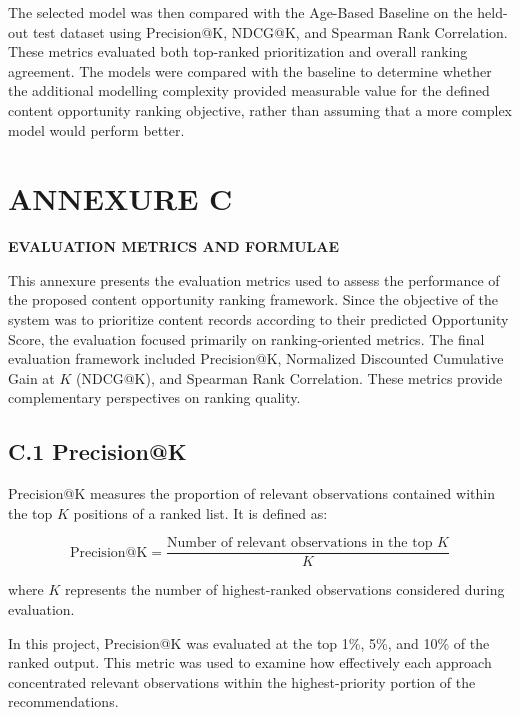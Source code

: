 \documentclass[12pt,a4paper]{report}
\begin{document}
The selected model was then compared with the Age-Based Baseline on the held-out test dataset using Precision@K, NDCG@K, and Spearman Rank Correlation. These metrics evaluated both top-ranked prioritization and overall ranking agreement. The models were compared with the baseline to determine whether the additional modelling complexity provided measurable value for the defined content opportunity ranking objective, rather than assuming that a more complex model would perform better.

\chapter*{ANNEXURE C}


\begin{center}
    \textbf{\Large EVALUATION METRICS AND FORMULAE}
\end{center}

\vspace{0.5cm}

This annexure presents the evaluation metrics used to assess the performance of the proposed content opportunity ranking framework. Since the objective of the system was to prioritize content records according to their predicted Opportunity Score, the evaluation focused primarily on ranking-oriented metrics. The final evaluation framework included Precision@K, Normalized Discounted Cumulative Gain at $K$ (NDCG@K), and Spearman Rank Correlation. These metrics provide complementary perspectives on ranking quality.

\section*{C.1 Precision@K}

Precision@K measures the proportion of relevant observations contained within the top $K$ positions of a ranked list. It is defined as:

\begin{equation}
\text{Precision@K}
=
\frac{\text{Number of relevant observations in the top } K}
{K}
\end{equation}

where $K$ represents the number of highest-ranked observations considered during evaluation.

In this project, Precision@K was evaluated at the top 1\%, 5\%, and 10\% of the ranked output. This metric was used to examine how effectively each approach concentrated relevant observations within the highest-priority portion of the recommendations.
\end{document}
